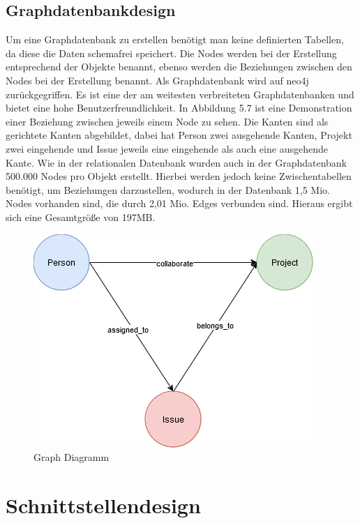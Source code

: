 \subsection{Graphdatenbankdesign} %
\label{sec:graphsdatenbankdesign}
Um eine Graphdatenbank zu erstellen benötigt man keine definierten Tabellen, da diese die Daten schemafrei speichert. Die Nodes werden bei der Erstellung entsprechend der Objekte benannt, ebenso werden die Beziehungen zwischen den Nodes bei der Erstellung benannt. Als Graphdatenbank wird auf neo4j zurückgegriffen. Es ist eine der am weitesten verbreiteten Graphdatenbanken und bietet eine hohe Benutzerfreundlichkeit. In Abbildung 5.7 ist eine Demonstration einer Beziehung zwischen jeweils einem Node zu sehen. Die Kanten sind als gerichtete Kanten abgebildet, dabei hat Person zwei ausgehende Kanten, Projekt zwei eingehende und Issue jeweils eine eingehende als auch eine ausgehende Kante. Wie in der relationalen Datenbank wurden auch in der Graphdatenbank 500.000 Nodes pro Objekt erstellt. Hierbei werden jedoch keine Zwischentabellen benötigt, um Beziehungen darzustellen, wodurch in der Datenbank 1,5 Mio. Nodes vorhanden sind, die durch 2,01 Mio. Edges verbunden sind. Hieraus ergibt sich eine Gesamtgröße von 197MB.


\begin{figure}[H]
	\centering
	\includegraphics[scale=.8]{Illustrations/graph_diagram}
	\caption{Graph Diagramm}
\end{figure}

\newpage
\section{Schnittstellendesign} %
\label{sec:schnittstellendesign}

